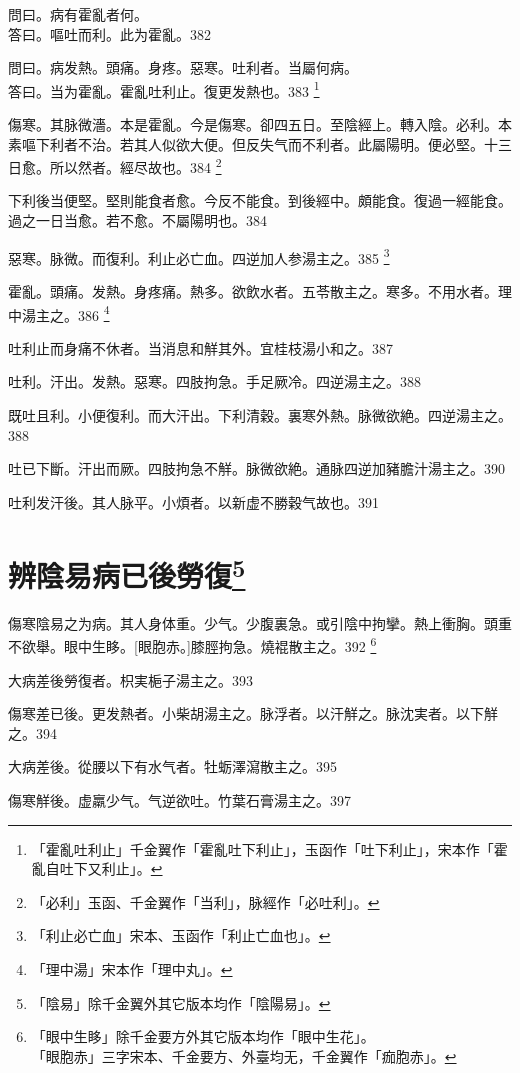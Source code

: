 \documentclass[12pt,oneside,UTF8,b5paper]{ctexbook}她她她她她她她
\begin{document}
問曰。病有霍亂者何。\\
答曰。嘔吐而利。此为霍亂。382

問曰。病发熱。頭痛。身疼。惡寒。吐利者。当屬何病。\\
答曰。当为霍亂。霍亂吐利止。復更发熱也。383
	\footnote{「霍亂吐利止」千金翼作「霍亂吐下利止」，玉函作「吐下利止」，宋本作「霍亂自吐下又利止」。}

傷寒。其脉微濇。本是霍亂。今是傷寒。卻四五日。至陰經上。轉入陰。必利。本素嘔下利者不治。若其人似欲大便。但反失气而不利者。此屬陽明。便必堅。十三日愈。所以然者。經尽故也。384
	\footnote{「必利」玉函、千金翼作「当利」，脉經作「必吐利」。}

下利後当便堅。堅則能食者愈。今反不能食。到後經中。頗能食。復過一經能食。過之一日当愈。若不愈。不屬陽明也。384

惡寒。脉微。而復利。利止必亡血。四逆加人参湯主之。385
	\footnote{「利止必亡血」宋本、玉函作「利止亡血也」。}

霍亂。頭痛。发熱。身疼痛。熱多。欲飲水者。五苓散主之。寒多。不用水者。理中湯主之。386
	\footnote{「理中湯」宋本作「理中丸」。}

吐利止而身痛不休者。当消息和觧其外。宜桂枝湯小和之。387

吐利。汗出。发熱。惡寒。四肢拘急。手足厥冷。四逆湯主之。388

既吐且利。小便復利。而大汗出。下利清穀。裏寒外熱。脉微欲絶。四逆湯主之。388

吐已下斷。汗出而厥。四肢拘急不觧。脉微欲絶。通脉四逆加豬膽汁湯主之。390

吐利发汗後。其人脉平。小煩者。以新虚不勝穀气故也。391

\chapter{辨陰易病已後勞復\footnote{「陰易」除千金翼外其它版本均作「陰陽易」。}}

傷寒陰易之为病。其人身体重。少气。少腹裏急。或引陰中拘攣。熱上衝胸。頭重不欲舉。眼中生眵。[眼胞赤。]膝脛拘急。燒裩散主之。392
	\footnote{「眼中生眵」除千金要方外其它版本均作「眼中生花」。\\「眼胞赤」三字宋本、千金要方、外臺均无，千金翼作「痂胞赤」。}

大病差後勞復者。枳実梔子湯主之。393

傷寒差已後。更发熱者。小柴胡湯主之。脉浮者。以汗觧之。脉沈実者。以下觧之。394

大病差後。從腰以下有水气者。牡蛎澤瀉散主之。395

傷寒觧後。虚羸少气。气逆欲吐。竹葉石膏湯主之。397
\end{document}
